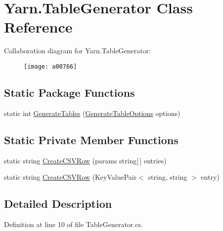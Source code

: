 \hypertarget{a00171}{\section{Yarn.\-Table\-Generator Class Reference}
\label{a00171}
}


Collaboration diagram for Yarn.\-Table\-Generator\-:
\nopagebreak
\begin{figure}[H]
\begin{center}
\leavevmode
\texttt{[image: a00766]}
\end{center}
\end{figure}
\subsection*{Static Package Functions}
\begin{DoxyCompactItemize}
\item 
static int \hyperlink{a00171_a1d65ef643c3f3495cf9480f86172ff87}{Generate\-Tables} (\hyperlink{a00109}{Generate\-Table\-Options} options)
\end{DoxyCompactItemize}
\subsection*{Static Private Member Functions}
\begin{DoxyCompactItemize}
\item 
static string \hyperlink{a00171_ac03637d16d3512258c997b9a21af6c42}{Create\-C\-S\-V\-Row} (params string\mbox{[}$\,$\mbox{]} entries)
\item 
static string \hyperlink{a00171_aa16da6b6810ce3a5fd2a7920de6322ef}{Create\-C\-S\-V\-Row} (Key\-Value\-Pair$<$ string, string $>$ entry)
\end{DoxyCompactItemize}


\subsection{Detailed Description}


Definition at line 10 of file Table\-Generator.\-cs.



